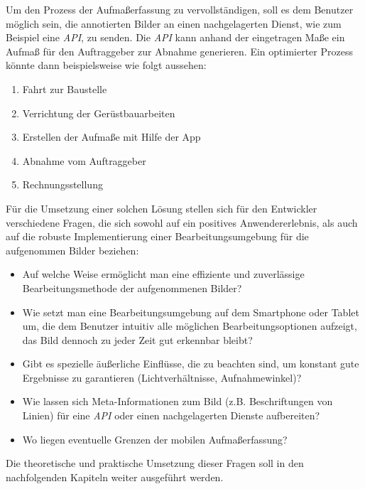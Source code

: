 Um den Prozess der Aufmaßerfassung zu vervollständigen, soll es dem Benutzer möglich sein, die annotierten Bilder an einen nachgelagerten Dienst, wie zum Beispiel eine \emph{API}, zu senden.
Die \emph{API} kann anhand der eingetragen Maße ein Aufmaß für den Auftraggeber zur Abnahme generieren.
Ein optimierter Prozess könnte dann beispielsweise wie folgt aussehen:
\begin{enumerate}
  \item Fahrt zur Baustelle
  \item Verrichtung der Gerüstbauarbeiten
  \item Erstellen der Aufmaße mit Hilfe der App
  \item Abnahme vom Auftraggeber
  \item Rechnungsstellung
\end{enumerate} 

\noindent
Für die Umsetzung einer solchen Lösung stellen sich für den Entwickler verschiedene Fragen, die sich sowohl auf ein positives Anwendererlebnis, als auch auf die robuste Implementierung einer Bearbeitungsumgebung für die aufgenommen Bilder beziehen:

\begin{itemize}
  \item Auf welche Weise ermöglicht man eine effiziente und zuverlässige Bearbeitungsmethode der aufgenommenen Bilder?
  \item Wie setzt man eine Bearbeitungsumgebung auf dem Smartphone oder Tablet um, die dem Benutzer intuitiv alle möglichen Bearbeitungsoptionen aufzeigt, das Bild dennoch zu jeder Zeit gut erkennbar bleibt?
  \item Gibt es spezielle äußerliche Einflüsse, die zu beachten sind, um konstant gute Ergebnisse zu garantieren (Lichtverhältnisse, Aufnahmewinkel)?
  \item Wie lassen sich Meta-Informationen zum Bild (z.B. Beschriftungen von Linien) für eine \emph{API} oder einen nachgelagerten Dienste aufbereiten?
  \item Wo liegen eventuelle Grenzen der mobilen Aufmaßerfassung?
\end{itemize}

\noindent
Die theoretische und praktische Umsetzung dieser Fragen soll in den nachfolgenden Kapiteln weiter ausgeführt werden.
